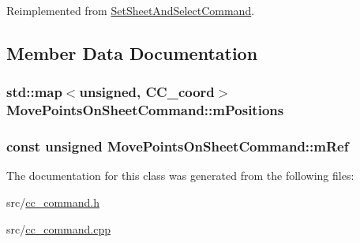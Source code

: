 Reimplemented from \hyperlink{a00132_ae017079a0a6c65222f10968fad8fc082}{Set\-Sheet\-And\-Select\-Command}.



\subsection{Member Data Documentation}
\hypertarget{a00112_a53972ae70cedfa512008abc69516e350}{
\subsubsection[{m\-Positions}]{\setlength{\rightskip}{0pt plus 5cm}std\-::map$<$unsigned, {\bf C\-C\-\_\-coord}$>$ Move\-Points\-On\-Sheet\-Command\-::m\-Positions\hspace{0.3cm}{\ttfamily [protected]}}}\label{a00112_a53972ae70cedfa512008abc69516e350}
\hypertarget{a00112_a4058eda12b7e5ffb059bd1082a0e370b}{
\subsubsection[{m\-Ref}]{\setlength{\rightskip}{0pt plus 5cm}const unsigned Move\-Points\-On\-Sheet\-Command\-::m\-Ref\hspace{0.3cm}{\ttfamily [protected]}}}\label{a00112_a4058eda12b7e5ffb059bd1082a0e370b}


The documentation for this class was generated from the following files\-:\begin{DoxyCompactItemize}
\item 
src/\hyperlink{a00183}{cc\-\_\-command.\-h}\item 
src/\hyperlink{a00182}{cc\-\_\-command.\-cpp}\end{DoxyCompactItemize}
